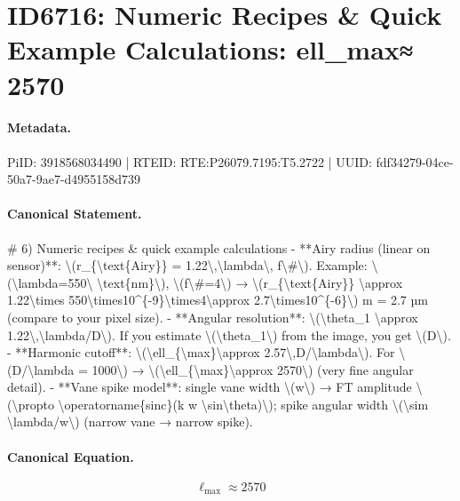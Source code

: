 \section*{ID6716: Numeric Recipes \& Quick Example Calculations: ell\_max≈ 2570}
\paragraph{Metadata.}
PiID: 3918568034490 | RTEID: RTE:P26079.7195:T5.2722 | UUID: fdf34279-04ce-50a7-9ae7-d4955158d739

\paragraph{Canonical Statement.}
\# 6) Numeric recipes \& quick example calculations - **Airy radius (linear on sensor)**: \textbackslash{}(r\_\{\textbackslash{}text\{Airy\}\} = 1.22\textbackslash{},\textbackslash{}lambda\textbackslash{}, f\textbackslash{}\#\textbackslash{}). Example: \textbackslash{}(\textbackslash{}lambda=550\textbackslash{} \textbackslash{}text\{nm\}\textbackslash{}), \textbackslash{}(f\textbackslash{}\#=4\textbackslash{}) → \textbackslash{}(r\_\{\textbackslash{}text\{Airy\}\} \textbackslash{}approx 1.22\textbackslash{}times 550\textbackslash{}times10\textasciicircum{}\{-9\}\textbackslash{}times4\textbackslash{}approx 2.7\textbackslash{}times10\textasciicircum{}\{-6\}\textbackslash{}) m = 2.7 µm (compare to your pixel size). - **Angular resolution**: \textbackslash{}(\textbackslash{}theta\_1 \textbackslash{}approx 1.22\textbackslash{},\textbackslash{}lambda/D\textbackslash{}). If you estimate \textbackslash{}(\textbackslash{}theta\_1\textbackslash{}) from the image, you get \textbackslash{}(D\textbackslash{}). - **Harmonic cutoff**: \textbackslash{}(\textbackslash{}ell\_\{\textbackslash{}max\}\textbackslash{}approx 2.57\textbackslash{},D/\textbackslash{}lambda\textbackslash{}). For \textbackslash{}(D/\textbackslash{}lambda = 1000\textbackslash{}) → \textbackslash{}(\textbackslash{}ell\_\{\textbackslash{}max\}\textbackslash{}approx 2570\textbackslash{}) (very fine angular detail). - **Vane spike model**: single vane width \textbackslash{}(w\textbackslash{}) → FT amplitude \textbackslash{}(\textbackslash{}propto \textbackslash{}operatorname\{sinc\}(k w \textbackslash{}sin\textbackslash{}theta)\textbackslash{}); spike angular width \textbackslash{}(\textbackslash{}sim \textbackslash{}lambda/w\textbackslash{}) (narrow vane → narrow spike).

\paragraph{Canonical Equation.}
\[
\ell_{\max}\approx 2570
\]

